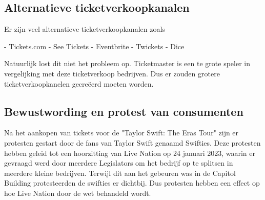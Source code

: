 \subsection{Alternatieve ticketverkoopkanalen}

Er zijn veel alternatieve ticketverkoopkanalen zoals

- Tickets.com
- See Tickets
- Eventbrite
- Twickets
- Dice

Natuurlijk lost dit niet het probleem op. Ticketmaster is een te grote speler in vergelijking met deze ticketverkoop
bedrijven. Dus er zouden grotere ticketverkoopkanelen gecreëerd moeten worden.


\subsection{Bewustwording en protest van consumenten}

Na het aankopen van tickets voor de "Taylor Swift: The Eras Tour" zijn er protesten gestart door de fans van
Taylor Swift genaamd Swifties. Deze protesten hebben geleid tot een hoorzitting van Live Nation op 24 januari 2023,
waarin er gevraagd werd door meerdere Legislators om het bedrijf op te splitsen in meerdere kleine bedrijven.
Terwijl dit aan het gebeuren was in de Capitol Building protesteerden de swifties er dichtbij. 
Dus protesten hebben een effect op hoe Live Nation door de wet behandeld wordt. 


